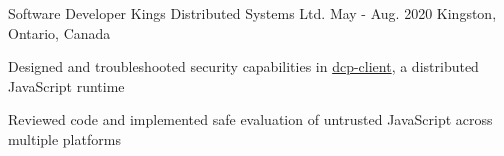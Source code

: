 \begin{cventries}
  \cventry
    {Software Developer} %
    {Kings Distributed Systems Ltd.} %
    {May - Aug. 2020} %
    {Kingston, Ontario, Canada} %
    {
      \begin{cvitems} %
        \item{Designed and troubleshooted security capabilities in \href{https://www.npmjs.com/package/dcp-client}{dcp-client}, a distributed JavaScript runtime}
        \item{Reviewed code and implemented safe evaluation of untrusted JavaScript across multiple platforms}
      \end{cvitems}
    }


\end{cventries}
